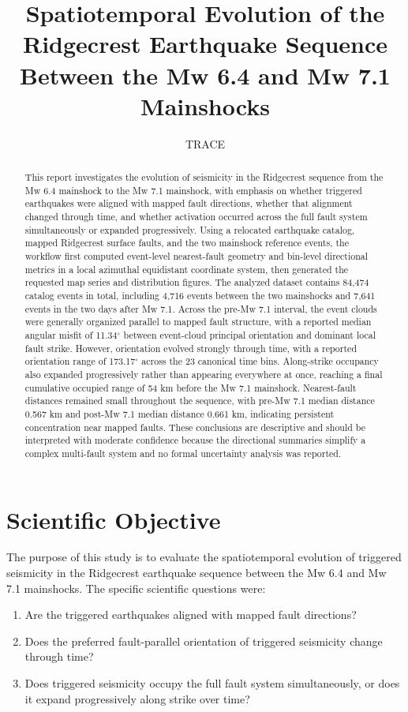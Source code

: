 \documentclass[11pt]{article}
\title{Spatiotemporal Evolution of the Ridgecrest Earthquake Sequence Between the Mw 6.4 and Mw 7.1 Mainshocks}
\author{TRACE}
\date{}
\begin{document}
\maketitle

\begin{abstract}
This report investigates the evolution of seismicity in the Ridgecrest sequence from the Mw 6.4 mainshock to the Mw 7.1 mainshock, with emphasis on whether triggered earthquakes were aligned with mapped fault directions, whether that alignment changed through time, and whether activation occurred across the full fault system simultaneously or expanded progressively. Using a relocated earthquake catalog, mapped Ridgecrest surface faults, and the two mainshock reference events, the workflow first computed event-level nearest-fault geometry and bin-level directional metrics in a local azimuthal equidistant coordinate system, then generated the requested map series and distribution figures. The analyzed dataset contains 84,474 catalog events in total, including 4,716 events between the two mainshocks and 7,641 events in the two days after Mw 7.1. Across the pre-Mw 7.1 interval, the event clouds were generally organized parallel to mapped fault structure, with a reported median angular misfit of 11.34$^{\circ}$ between event-cloud principal orientation and dominant local fault strike. However, orientation evolved strongly through time, with a reported orientation range of 173.17$^{\circ}$ across the 23 canonical time bins. Along-strike occupancy also expanded progressively rather than appearing everywhere at once, reaching a final cumulative occupied range of 54 km before the Mw 7.1 mainshock. Nearest-fault distances remained small throughout the sequence, with pre-Mw 7.1 median distance 0.567 km and post-Mw 7.1 median distance 0.661 km, indicating persistent concentration near mapped faults. These conclusions are descriptive and should be interpreted with moderate confidence because the directional summaries simplify a complex multi-fault system and no formal uncertainty analysis was reported.
\end{abstract}

\section{Scientific Objective}
The purpose of this study is to evaluate the spatiotemporal evolution of triggered seismicity in the Ridgecrest earthquake sequence between the Mw 6.4 and Mw 7.1 mainshocks. The specific scientific questions were:
\begin{enumerate}[label=\arabic*.]
    \item Are the triggered earthquakes aligned with mapped fault directions?
    \item Does the preferred fault-parallel orientation of triggered seismicity change through time?
    \item Does triggered seismicity occupy the full fault system simultaneously, or does it expand progressively along strike over time?
\end{enumerate}
\end{document}
